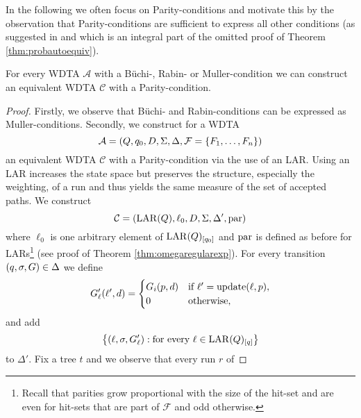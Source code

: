 In the following we often focus on Parity-conditions and motivate this by the
observation that Parity-conditions are sufficient to express all other 
conditions (as suggested in \cite[page 24:9, Proposition 6]{RandAutoInfTrees}
and which is an integral part of the omitted proof of Theorem 
\ref{thm:probautoequiv}).
\begin{lemma}
  For every \ac{WDTA} $\mathcal{A}$ with a Büchi-, Rabin- or Muller-condition 
  we can construct an equivalent \ac{WDTA} $\mathcal{C}$ with a 
  Parity-condition.
  \label{lem:wdtaparityexpressiveness}
\end{lemma}
\begin{proof}
  Firstly, we observe that Büchi- and Rabin-conditions can be expressed
  as Muller-conditions. Secondly, we construct for a 
  \ac{WDTA}
  \begin{equation*}
    \mathcal{A} = \left(
      Q, q_{0}, D, \Sigma, \Delta, \mathcal{F} = \left\{F_{1},\dots,F_{n}\right\}
    \right)
  \end{equation*}
  an equivalent \ac{WDTA} $\mathcal{C}$ with a Parity-condition via the use of
  an \ac{LAR}. Using an \ac{LAR} increases the state space but preserves the 
  structure, especially the weighting, of a run and thus yields the same 
  measure of the set of accepted paths. We construct
  \begin{equation*}
    \mathcal{C}=\left(
      \operatorname{LAR}(Q),\ell_{0}, D, \Sigma, \Delta', \operatorname{par}
    \right)
  \end{equation*} 
  where $\ell_{0}$ is one arbitrary element of $\operatorname{LAR}(Q)_{\left[q_{0}\right]}$ and 
  $\operatorname{par}$ is defined as before for \acp{LAR}\footnote{
    Recall that parities grow proportional with the size of the hit-set and are 
    even for hit-sets that are part of $\mathcal{F}$ and odd otherwise.
  } (see proof of Theorem \ref{thm:omegaregularexp}). For every transition 
  $\left(q,\sigma,G\right)\in\Delta$ we define
  \begin{equation*}
    G_{\ell}'(\ell', d) = \begin{cases}
      G_{i}(p,d) &\text{if }\ell' = \operatorname{update}(\ell,p),\\
      0          &\text{otherwise,}
    \end{cases}
  \end{equation*}
  and add
  \begin{equation*}
    \left\{
      \left(\ell,\sigma,G_{\ell}'\right):\text{for every }\ell\in
        \operatorname{LAR}(Q)_{\left[q\right]}
    \right\}
  \end{equation*}
  to $\Delta'$. Fix a tree $t$ and we observe that every run $r$ of 

\end{proof}

